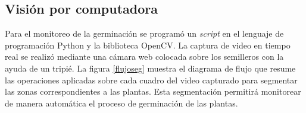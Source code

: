 \subsection{Visión por computadora}
Para el monitoreo de la germinación se programó un \textit{script} en el lenguaje de programación Python y la biblioteca OpenCV. La captura de video en tiempo real se realizó mediante una cámara web colocada sobre los semilleros con la ayuda de un tripié. La figura \ref{flujoseg} muestra el diagrama de flujo que resume las operaciones aplicadas sobre cada cuadro del video capturado para segmentar las zonas correspondientes a las plantas. Esta segmentación permitirá monitorear de manera automática el proceso de germinación de las plantas.

